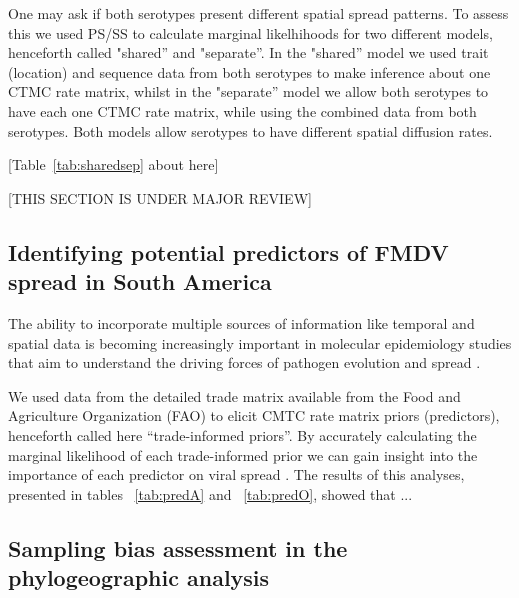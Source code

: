 \documentclass[10pt]{article}
\begin{document}
One may ask if both serotypes present different spatial spread patterns.
To assess this we used PS/SS to calculate marginal likelhihoods for two different models, henceforth  called "shared'' and "separate''.
In the "shared'' model we used trait (location) and sequence data  from both serotypes to make inference about one CTMC rate matrix, whilst in the "separate'' model we allow both serotypes to have each one CTMC rate matrix, while using the combined data from both serotypes.
Both models allow serotypes to have different spatial diffusion rates.
\begin{center}
 [Table~\ref{tab:sharedsep} about here]
\end{center}

\begin{center}
 [THIS SECTION IS UNDER MAJOR REVIEW]
\end{center}

\subsection*{Identifying potential predictors of FMDV spread in South America}
The ability to incorporate multiple sources of information like temporal and spatial data is becoming increasingly important in molecular epidemiology studies that aim to understand the driving forces of pathogen evolution and spread \cite{towards,combining,MEP,roots}. 

We used data from the detailed trade matrix available from the Food and Agriculture Organization (FAO) to elicit CMTC rate matrix priors (predictors), henceforth called here ``trade-informed priors''.
By accurately calculating the marginal likelihood of each trade-informed prior we can gain insight into the importance of each predictor on viral spread \cite{Carvalho2012,Nelson2011}.
The results of this analyses, presented in tables ~\ref{tab:predA} and ~\ref{tab:predO}, showed that ... %


\subsection*{Sampling bias assessment in the phylogeographic analysis}
\end{document}
